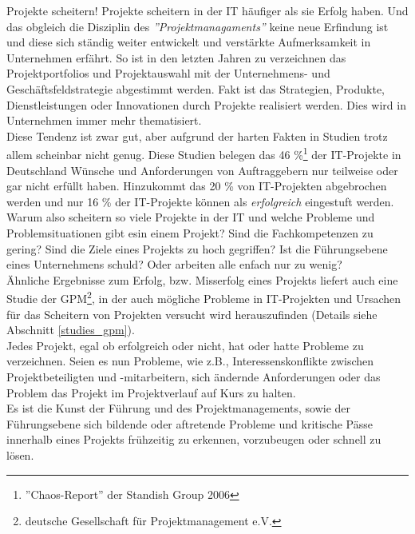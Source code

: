 \documentclass[12pt]{scrartcl}
\begin{document}
Projekte scheitern! Projekte scheitern in der IT häufiger als sie Erfolg haben. Und das obgleich die Disziplin des \textit{''Projektmanagaments''} keine neue Erfindung ist und diese sich ständig weiter entwickelt und verstärkte Aufmerksamkeit in Unternehmen erfährt. So ist in den letzten Jahren zu verzeichnen das Projektportfolios und Projektauswahl mit der Unternehmens- und Geschäftsfeldstrategie abgestimmt werden. Fakt ist das Strategien, Produkte, Dienstleistungen oder Innovationen durch Projekte realisiert werden. Dies wird in Unternehmen immer mehr thematisiert.\\
Diese Tendenz ist zwar gut, aber aufgrund der harten Fakten in Studien trotz allem scheinbar nicht genug. Diese Studien belegen das 46 \%\footnote{''Chaos-Report'' der Standish Group 2006} der IT-Projekte in Deutschland Wünsche und Anforderungen von Auftraggebern nur teilweise oder gar nicht erfüllt haben. Hinzukommt das 20 \% von IT-Projekten abgebrochen werden und nur 16 \% der IT-Projekte können als \textit{erfolgreich} eingestuft werden. Warum also scheitern so viele Projekte in der IT und welche Probleme und Problemsituationen gibt esin einem Projekt? Sind die Fachkompetenzen zu gering? Sind die Ziele eines Projekts zu hoch gegriffen? Ist die Führungsebene eines Unternehmens schuld? Oder arbeiten alle enfach nur zu wenig?\\
Ähnliche Ergebnisse zum Erfolg, bzw. Misserfolg eines Projekts liefert auch eine Studie der GPM\footnote{deutsche Gesellschaft für Projektmanagement e.V.}, in der auch mögliche Probleme in IT-Projekten und Ursachen für das Scheitern von Projekten versucht wird herauszufinden (Details siehe Abschnitt \ref{studies_gpm}).\\ 
Jedes Projekt, egal ob erfolgreich oder nicht, hat oder hatte Probleme zu verzeichnen. Seien es nun Probleme, wie z.B., Interessenskonflikte zwischen Projektbeteiligten und -mitarbeitern, sich ändernde Anforderungen oder das Problem das Projekt im Projektverlauf auf Kurs zu halten. \\
Es ist die Kunst der Führung und des Projektmanagements, sowie der Führungsebene sich bildende oder aftretende Probleme  und kritische Pässe innerhalb eines Projekts frühzeitig zu erkennen, vorzubeugen oder schnell zu lösen. 

\pagebreak
\end{document}
